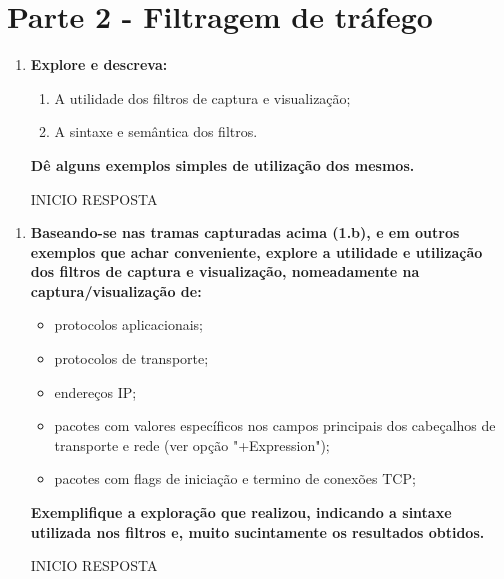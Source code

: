 \documentclass{llncs}
\begin{document}
\section{Parte 2 - Filtragem de tráfego}

\begin{enumerate}[\textbf{a)}]
  \item \textbf{Explore e descreva:}
  \begin{enumerate}[i]
    \item A utilidade dos filtros de captura e visualização;    
    \item A sintaxe e semântica dos filtros.
  \end{enumerate}
  \par\textbf{Dê alguns exemplos simples de utilização dos mesmos.}
  \begin{flushleft}
    INICIO RESPOSTA
  \end{flushleft}
\end{enumerate}


\begin{enumerate}[\textbf{b)}]
  \item  \textbf{Baseando-se nas tramas capturadas acima (1.b), e em outros exemplos que achar conveniente, explore a
  utilidade e utilização dos filtros de captura e visualização, nomeadamente na captura/visualização de:}
  \begin{itemize}
    \item protocolos aplicacionais;
    \item protocolos de transporte;
    \item endereços IP;
    \item pacotes com valores específicos nos campos principais dos cabeçalhos de transporte e rede (ver opção
    "+Expression");
    \item pacotes com flags de iniciação e termino de conexões TCP;
  \end{itemize}
  \par \textbf{Exemplifique a exploração que realizou, indicando a sintaxe utilizada nos filtros e, muito sucintamente os
  resultados obtidos.}
  \begin{flushleft}
    INICIO RESPOSTA
  \end{flushleft}
\end{enumerate}
\end{document}
